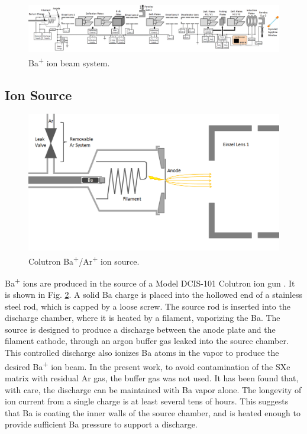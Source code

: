 \begin{figure} %
        \centering
                \includegraphics[angle=90,width=.25\textwidth]{figures/ionBeam.png} %
                \caption{Ba\textsuperscript{+} ion beam system.}
\label{fig:ionbeam}
\end{figure}

\subsection{Ion Source}

\begin{figure} %
        \centering
                \includegraphics[width=.95\textwidth]{figures/ionSource.png}
                \caption{Colutron Ba\textsuperscript{+}/Ar\textsuperscript{+} ion source.}
\label{fig:ionsource}
\end{figure}

Ba\textsuperscript{+} ions are produced in the source of a Model DCIS-101 Colutron ion gun \cite{Colutron}.  It is shown in Fig. \ref{fig:ionsource}.  A solid Ba charge is placed into the hollowed end of a stainless steel rod, which is capped by a loose screw.  The source rod is inserted into the discharge chamber, where it is heated by a filament, vaporizing the Ba.  The source is designed to produce a discharge between the anode plate and the filament cathode, through an argon buffer gas leaked into the source chamber.  This controlled discharge also ionizes Ba atoms in the vapor to produce the desired Ba\textsuperscript{+} ion beam.  In the present work, to avoid contamination of the SXe matrix with residual Ar gas, the buffer gas was not used.  It has been found that, with care, the discharge can be maintained with Ba vapor alone.  The longevity of ion current from a single charge is at least several tens of hours.  This suggests that Ba is coating the inner walls of the source chamber, and is heated enough to provide sufficient Ba pressure to support a discharge.

